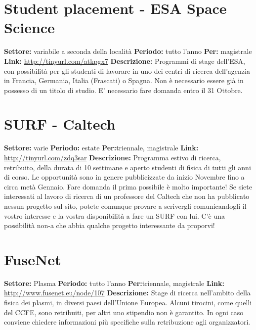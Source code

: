 \documentclass[a4paper,10pt]{article}
\begin{document}
\section{	Student placement - ESA	Space Science}	
\textbf{Settore:} variabile a seconda della località\newline
\textbf{Periodo:} tutto l'anno\newline
\textbf{Per:} magistrale\newline
\textbf{Link:} \url{http://tinyurl.com/atkpgx7} \newline
\textbf{Descrizione:}   	Programmi di stage dell’ESA, con possibilità per gli studenti di lavorare in uno dei centri di ricerca dell’agenzia in Francia, Germania, Italia (Frascati) o Spagna. Non è necessario essere già in possesso di un titolo di studio. E’ necessario fare domanda entro il 31 Ottobre.	

\section{	SURF - Caltech}
\textbf{Settore:} varie\newline
\textbf{Periodo:} estate\newline
\textbf{Per:}triennale, magistrale\newline
\textbf{Link:} \url{http://tinyurl.com/zdq3sar} \newline
\textbf{Descrizione:}  Programma estivo di ricerca, retribuito, della durata di 10 settimane e aperto studenti di fisica di tutti gli anni di corso. Le opportunità sono in genere pubblicizzate da inizio Novembre fino a circa metà Gennaio. Fare domanda il prima possibile è molto importante! Se siete interessati al lavoro di ricerca di un professore del Caltech che non ha pubblicato nessun progetto sul sito, potete comunque provare a scrivergli comunicandogli il vostro interesse e la vostra disponibilità a fare un SURF con lui. C’è una possibilità non-a che abbia qualche progetto interessante da proporvi!	

\section{	FuseNet}
\textbf{Settore:} Plasma\newline
\textbf{Periodo:} tutto l'anno\newline
\textbf{Per:}triennale, magistrale\newline
\textbf{Link:} \url{http://www.fusenet.eu/node/107} \newline
\textbf{Descrizione:}  	Stage di ricerca nell’ambito della fisica dei plasmi, in diversi paesi dell’Unione Europea. Alcuni tirocini, come quelli del CCFE, sono retribuiti, per altri uno stipendio non è garantito. In ogni caso conviene chiedere informazioni più specifiche sulla retribuzione agli organizzatori.	
\end{document}
